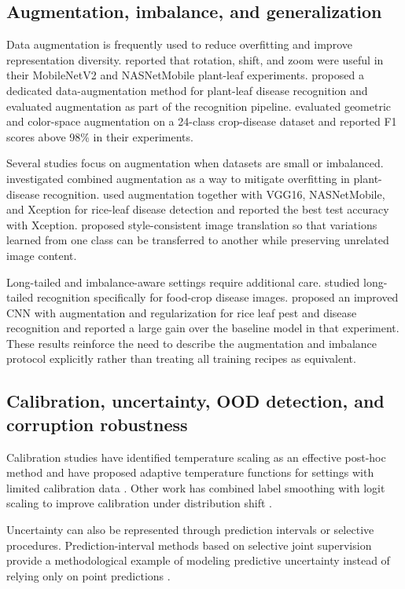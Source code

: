 \documentclass{sbc2023}%
\begin{document}
\subsection{Augmentation, imbalance, and generalization}
Data augmentation is frequently used to reduce overfitting and improve representation diversity. \citet{r06} reported that rotation, shift, and zoom were useful in their MobileNetV2 and NASNetMobile plant-leaf experiments. \citet{r09} proposed a dedicated data-augmentation method for plant-leaf disease recognition and evaluated augmentation as part of the recognition pipeline. \citet{r27} evaluated geometric and color-space augmentation on a 24-class crop-disease dataset and reported F1 scores above 98\% in their experiments.

Several studies focus on augmentation when datasets are small or imbalanced. \citet{r28} investigated combined augmentation as a way to mitigate overfitting in plant-disease recognition. \citet{r33} used augmentation together with VGG16, NASNetMobile, and Xception for rice-leaf disease detection and reported the best test accuracy with Xception. \citet{r34} proposed style-consistent image translation so that variations learned from one class can be transferred to another while preserving unrelated image content.

Long-tailed and imbalance-aware settings require additional care. \citet{r13} studied long-tailed recognition specifically for food-crop disease images. \citet{r37} proposed an improved CNN with augmentation and regularization for rice leaf pest and disease recognition and reported a large gain over the baseline model in that experiment. These results reinforce the need to describe the augmentation and imbalance protocol explicitly rather than treating all training recipes as equivalent.

\subsection{Calibration, uncertainty, OOD detection, and corruption robustness}
Calibration studies have identified temperature scaling as an effective post-hoc method and have proposed adaptive temperature functions for settings with limited calibration data \cite{r04,r21}. Other work has combined label smoothing with logit scaling to improve calibration under distribution shift \cite{r20}.

Uncertainty can also be represented through prediction intervals or selective procedures. Prediction-interval methods based on selective joint supervision provide a methodological example of modeling predictive uncertainty instead of relying only on point predictions \cite{r25}.
\end{document}
